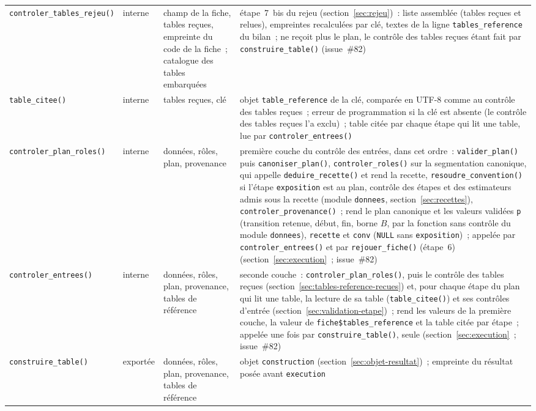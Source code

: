 \documentclass[a4paper,11pt]{article}
\newcommand{\code}[1]{\texttt{\small #1}}
\newcommand{\catalogue}[2]{\code{#2}}
\begin{document}
{\begin{longtable}{@{}p{6.2cm}p{1.4cm}p{2.6cm}p{4.4cm}@{}}
\catalogue{fonctions-construire-table}{controler\_tables\_rejeu()} & interne & champ de la fiche, tables reçues, empreinte du code de la fiche~; catalogue des tables embarquées & étape~7~bis du rejeu (section~\ref{sec:rejeu})~: liste assemblée (tables reçues et relues), empreintes recalculées par clé, textes de la ligne \code{tables\_reference} du bilan~; ne reçoit plus le plan, le contrôle des tables reçues étant fait par \code{construire\_table()} (issue~\#82) \\
\catalogue{fonctions-construire-table}{table\_citee()} & interne & tables reçues, clé & objet \code{table\_reference} de la clé, comparée en UTF-8 comme au contrôle des tables reçues~; erreur de programmation si la clé est absente (le contrôle des tables reçues l'a exclu)~; table citée par chaque étape qui lit une table, lue par \code{controler\_entrees()} \\
\catalogue{fonctions-construire-table}{controler\_plan\_roles()} & interne & données, rôles, plan, provenance & première couche du contrôle des entrées, dans cet ordre~: \code{valider\_plan()} puis \code{canoniser\_plan()}, \code{controler\_roles()} sur la segmentation canonique, qui appelle \code{deduire\_recette()} et rend la recette, \code{resoudre\_convention()} si l'étape \code{exposition} est au plan, contrôle des étapes et des estimateurs admis sous la recette (module \code{donnees}, section~\ref{sec:recettes}), \code{controler\_provenance()}~; rend le plan canonique et les valeurs validées \code{p} (transition retenue, début, fin, borne $B$, par la fonction sans contrôle du module \code{donnees}), \code{recette} et \code{conv} (\code{NULL} sans \code{exposition})~; appelée par \code{controler\_entrees()} et par \code{rejouer\_fiche()} (étape~6) (section~\ref{sec:execution}~; issue~\#82) \\
\catalogue{fonctions-construire-table}{controler\_entrees()} & interne & données, rôles, plan, provenance, tables de référence & seconde couche~: \code{controler\_plan\_roles()}, puis le contrôle des tables reçues (section~\ref{sec:tables-reference-recues}) et, pour chaque étape du plan qui lit une table, la lecture de sa table (\code{table\_citee()}) et ses contrôles d'entrée (section~\ref{sec:validation-etape})~; rend les valeurs de la première couche, la valeur de \code{fiche\$tables\_reference} et la table citée par étape~; appelée une fois par \code{construire\_table()}, seule (section~\ref{sec:execution}~; issue~\#82) \\
\catalogue{fonctions-construire-table}{construire\_table()} & exportée & données, rôles, plan, provenance, tables de référence & objet \code{construction} (section~\ref{sec:objet-resultat})~; empreinte du résultat posée avant \code{execution} \\

\end{longtable}}
\end{document}
